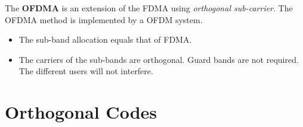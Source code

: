 \begin{refsection}
The  \textbf{\acf{OFDMA}} is an extension of the \ac{FDMA} using \emph{orthogonal sub-carrier}. The \ac{OFDMA} method is implemented by a \ac{OFDM} system.
\begin{itemize}
	\item The sub-band allocation equals that of \ac{FDMA}.
	\item The carriers of the sub-bands are orthogonal. Guard bands are not required. The different users will not interfere.
\end{itemize}


\section{Orthogonal Codes}



\nocite{ipatov2005}

{}
\printbibliography[heading=subbibliography]
\end{refsection}

